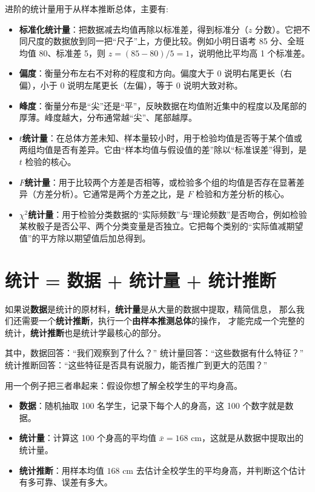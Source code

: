 \documentclass[lang=cn,10pt]{elegantbook}
\begin{document}
进阶的统计量用于从样本推断总体，主要有:
\begin{itemize}
  \item \textbf{标准化统计量}：把数据减去均值再除以标准差，得到标准分（$z$ 分数）。它把不同尺度的数据放到同一把“尺子”上，方便比较。例如小明日语考 85 分、全班均值 80、标准差 5，则 $z=(85-80)/5=1$，说明他比平均高 1 个标准差。
  \item \textbf{偏度}：衡量分布左右不对称的程度和方向。偏度大于 0 说明右尾更长（右偏），小于 0 说明左尾更长（左偏），等于 0 说明大致对称。
  \item \textbf{峰度}：衡量分布是“尖”还是“平”，反映数据在均值附近集中的程度以及尾部的厚薄。峰度越大，分布通常越“尖”、尾部越厚。
  \item \textbf{$t$统计量}：在总体方差未知、样本量较小时，用于检验均值是否等于某个值或两组均值是否有差异。它由“样本均值与假设值的差”除以“标准误差”得到，是 $t$ 检验的核心。
  \item \textbf{$F$统计量}：用于比较两个方差是否相等，或检验多个组的均值是否存在显著差异（方差分析）。它通常是两个方差之比，是 $F$ 检验和方差分析的核心。
  \item \textbf{$\chi^2$统计量}：用于检验分类数据的“实际频数”与“理论频数”是否吻合，例如检验某枚骰子是否公平、两个分类变量是否独立。它把每个类别的“实际值减期望值”的平方除以期望值后加总得到。
\end{itemize}



\section{统计 = 数据 + 统计量 + 统计推断}
如果说\textbf{数据}是统计的原材料，\textbf{统计量}是从大量的数据中提取，精简信息，
那么我们还需要一个\textbf{统计推断}，执行一个\textbf{由样本推测总体}的操作，
才能完成一个完整的统计，\textbf{统计推断}也是统计学最核心的部分。

其中，数据回答：“我们观察到了什么？”
统计量回答：“这些数据有什么特征？”
统计推断回答：“这些特征是否具有说服力，能否推广到更大的范围？”

用一个例子把三者串起来：假设你想了解全校学生的平均身高。
\begin{itemize}
  \item \textbf{数据}：随机抽取 100 名学生，记录下每个人的身高，这 100 个数字就是数据。
  \item \textbf{统计量}：计算这 100 个身高的平均值 $\bar{x}=168$ cm，这就是从数据中提取出的统计量。
  \item \textbf{统计推断}：用样本均值 $168$ cm 去估计全校学生的平均身高，并判断这个估计有多可靠、误差有多大。
\end{itemize}
\end{document}
